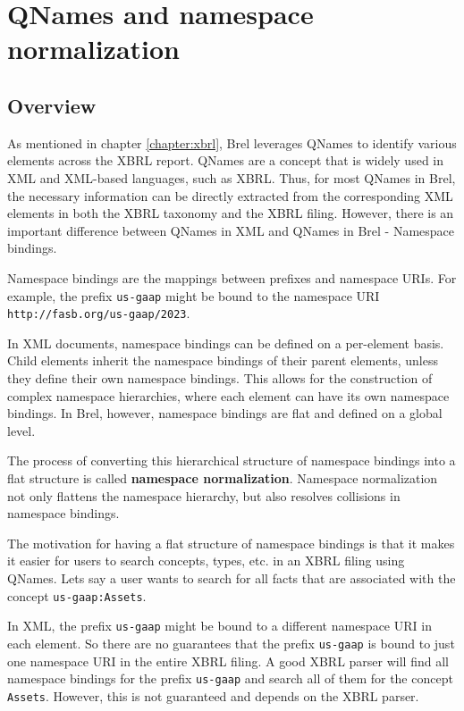 
\section{QNames and namespace normalization}
\label{sec:qnames_implementation}

\subsection{Overview}

As mentioned in chapter \ref{chapter:xbrl}, Brel leverages QNames to identify various elements across the XBRL report.
QNames are a concept that is widely used in XML and XML-based languages, such as XBRL.
Thus, for most QNames in Brel, the necessary information can be directly extracted from the corresponding XML elements in both the XBRL taxonomy and the XBRL filing.
However, there is an important difference between QNames in XML and QNames in Brel - Namespace bindings.

Namespace bindings are the mappings between prefixes and namespace URIs.
For example, the prefix \texttt{us-gaap} might be bound to the namespace URI \texttt{http://fasb.org/us-gaap/2023}.

In XML documents, namespace bindings can be defined on a per-element basis. 
Child elements inherit the namespace bindings of their parent elements, unless they define their own namespace bindings. 
This allows for the construction of complex namespace hierarchies, where each element can have its own namespace bindings.
In Brel, however, namespace bindings are flat and defined on a global level.

The process of converting this hierarchical structure of namespace bindings into a flat structure is called \textbf{namespace normalization}.
Namespace normalization not only flattens the namespace hierarchy, but also resolves collisions in namespace bindings.

The motivation for having a flat structure of namespace bindings is that it makes it easier for users to search concepts, types, etc. in an XBRL filing using QNames.
Lets say a user wants to search for all facts that are associated with the concept \texttt{us-gaap:Assets}.

In XML, the prefix \texttt{us-gaap} might be bound to a different namespace URI in each element.
So there are no guarantees that the prefix \texttt{us-gaap} is bound to just one namespace URI in the entire XBRL filing.
A good XBRL parser will find all namespace bindings for the prefix \texttt{us-gaap} and search all of them for the concept \texttt{Assets}.
However, this is not guaranteed and depends on the XBRL parser.


